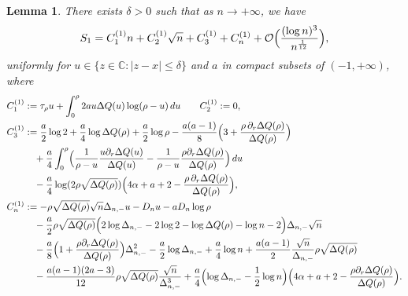 \documentclass[reqno]{amsart}
\newcommand{\1}{\mathds{1}}
\newcommand{\C}{\mathds{C}}
\numberwithin{equation}{section}
\newtheorem{lemma}[theorem]{Lemma}
\theoremstyle{definition}
\begin{document}
\begin{lemma}\label{lemma:S1}
There exists $\delta>0$ such that as $n\to+\infty$, we have 
\begin{equation}
\label{def of S1 asymptotics}
S_1= C_1^{(1)}n + C_2^{(1)}\sqrt{n}+C_3^{(1)}+C_n^{(1)}+
\mathcal{O}\Bigl(\frac{(\log n)^{3}}{n^{\frac{1}{12}}}\Bigr),    
\end{equation}
uniformly for $u\in\{z\in\C:|z-x|\leq \delta\}$ and $a$ in compact subsets of $(-1,+\infty)$, where 
\begin{align*}
C_1^{(1)}&:=
\tau_{\rho}u
+
\int_{0}^{\rho}2a u\Delta Q(u)\log(\rho-u)\,du
\qquad
C_2^{(1)}:=0,
\\
C_3^{(1)}&:=
\frac{a}{2}\log 2
+\frac{a}{4}\log\Delta Q(\rho)
+\frac{a}{2}\log\rho
-
\frac{a(a-1)}{8}\Bigl(3+\frac{\rho\,\partial_r\Delta Q(\rho)}{\Delta Q(\rho)}\Bigr)
\\
&\quad
+
\frac{a}{4}\int_0^{\rho}\Bigl(\frac{1}{\rho-u} 
\frac{u\partial_r\Delta Q(u)}{\Delta Q(u)}
-
\frac{1}{\rho-u} 
\frac{\rho\partial_r\Delta Q(\rho)}{\Delta Q(\rho)}
\Bigr)\,du
\\
&\quad
-\frac{a}{4}
\log(2\rho\sqrt{\Delta Q(\rho)})
\Bigl(4\alpha+a+2-\frac{\rho\,\partial_r\Delta Q(\rho)}{\Delta Q(\rho)}\Bigr),
\\
C_n^{(1)}&:=
-\rho\sqrt{\Delta Q(\rho)}\sqrt{n}\Delta_{n,-}u
-D_nu
-aD_{n}\log\rho
\\
&\quad
-\frac{a}{2}\rho\sqrt{\Delta Q(\rho)}
\Bigl(2\log\Delta_{n,-}-2\log 2 -\log\Delta Q(\rho)-\log n-2\Bigr)\Delta_{n,-}\sqrt{n}
\\
&\quad
-\frac{a}{8}\Bigl(1+\frac{\rho\partial_r\Delta Q(\rho)}{\Delta Q(\rho)}\Bigr)\Delta_{n,-}^2
-\frac{a}{2}\log\Delta_{n,-}
+\frac{a}{4}\log n
+\frac{a(a-1)}{2}
\frac{\sqrt{n}}{\Delta_{n,-}}\rho\sqrt{\Delta Q(\rho)}
\\
&\quad
-\frac{a(a-1)(2a-3)}{12}\rho\sqrt{\Delta Q(\rho)}\frac{\sqrt{n}}{\Delta_{n,-}^3}
+\frac{a}{4}\Bigl(\log\Delta_{n,-}-\frac{1}{2}\log n\Bigr)
\Bigl( 4\alpha+a+2 -\frac{\rho\partial_r\Delta Q(\rho)}{\Delta Q(\rho)} \Bigr).
\end{align*}
\end{lemma}
\end{document}
